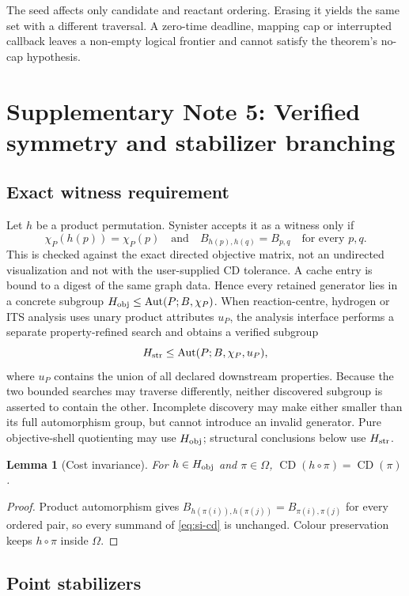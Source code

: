 \documentclass[11pt]{article}
\newtheorem{lemma}[theorem]{Lemma}
\theoremstyle{definition}
\newcommand{\Aut}{\operatorname{Aut}}
\newcommand{\CD}{\operatorname{CD}}
\begin{document}
The seed affects only candidate and reactant ordering.  Erasing it yields the
same set with a different traversal.  A zero-time deadline, mapping cap or
interrupted callback leaves a non-empty logical frontier and cannot satisfy
the theorem's no-cap hypothesis.

\section{Supplementary Note 5: Verified symmetry and stabilizer branching}

\subsection{Exact witness requirement}

Let \(h\) be a product permutation.  Synister accepts it as a witness only if
\[
 \chi_P(h(p))=\chi_P(p)
 \quad\text{and}\quad
 B_{h(p),h(q)}=B_{p,q}
 \quad\text{for every }p,q.
\]
This is checked against the exact directed objective matrix, not an
undirected visualization and not with the user-supplied CD tolerance.  A cache
entry is bound to a digest of the same graph data.  Hence every retained
generator lies in a concrete subgroup
\(H_{\rm obj}\leq\Aut(P;B,\chi_P)\).  When reaction-centre, hydrogen or ITS
analysis uses unary product attributes \(u_P\), the analysis interface performs
a separate property-refined search and obtains a verified subgroup
\[
 H_{\rm str}\leq\Aut(P;B,\chi_P,u_P),
\]
where \(u_P\) contains the union of all declared downstream properties.
Because the two bounded searches may traverse differently, neither discovered
subgroup is asserted to contain the other.  Incomplete discovery may make
either smaller than its full automorphism group, but cannot introduce an
invalid generator.  Pure objective-shell quotienting may use \(H_{\rm obj}\);
structural conclusions below use \(H_{\rm str}\).

\begin{lemma}[Cost invariance]
For \(h\in H_{\rm obj}\) and \(\pi\in\Omega\),
\(\CD(h\circ\pi)=\CD(\pi)\).
\end{lemma}

\begin{proof}
Product automorphism gives
\(B_{h(\pi(i)),h(\pi(j))}=B_{\pi(i),\pi(j)}\) for every ordered pair, so every
summand of \cref{eq:si-cd} is unchanged.  Colour preservation keeps
\(h\circ\pi\) inside \(\Omega\).
\end{proof}

\subsection{Point stabilizers}
\end{document}
